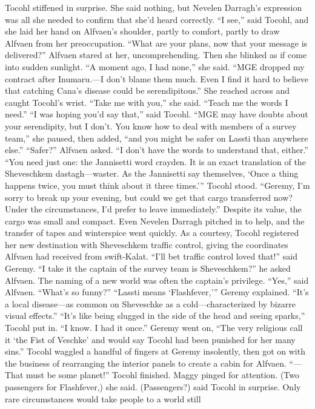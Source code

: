 \documentclass[9pt]{article}
\begin{document}
Tocohl stiffened in surprise. She said nothing, but Nevelen Darragh’s expression was all she needed
to confirm that she’d heard correctly.
“I see,” said Tocohl, and she laid her hand on Alfvaen’s shoulder, partly to comfort, partly to draw
Alfvaen from her preoccupation. “What are your plans, now that your message is delivered?”
Alfvaen stared at her, uncomprehending. Then she blinked as if come into sudden sunlight.
“A moment ago, I had none,” she said. “MGE dropped my contract after Inumaru.—I don’t blame
them much. Even I find it hard to believe that catching Cana’s disease could be serendipitous.”
She reached across and caught Tocohl’s wrist. “Take me with you,” she said. “Teach me the words I
need.”
“I was hoping you’d say that,” said Tocohl. “MGE may have doubts about your serendipity, but I
don’t. You know how to deal with members of a survey team,” she paused, then added, “and you might
be safer on Lassti than anywhere else.”
“Safer?” Alfvaen asked. “I don’t have the words to understand that, either.”
“You need just one: the Jannisetti word crayden. It is an exact translation of the Sheveschkem
dastagh—waster. As the Jannisetti say themselves, ‘Once a thing happens twice, you must think about it
three times.’” Tocohl stood. “Geremy, I’m sorry to break up your evening, but could we get that cargo
transferred now? Under the circumstances, I’d prefer to leave immediately.”
Despite its value, the cargo was small and compact. Even Nevelen Darragh pitched in to help, and
the transfer of tapes and winterspice went quickly. As a courtesy, Tocohl registered her new destination
with Sheveschkem traffic control, giving the coordinates Alfvaen had received from swift-Kalat.
“I’ll bet traffic control loved that!” said Geremy. “I take it the captain of the survey team is
Sheveschkem?” he asked Alfvaen. The naming of a new world was often the captain’s privilege.
“Yes,” said Alfvaen. “What’s so funny?”
“Lassti means ‘Flashfever,’” Geremy explained. “It’s a local disease—as common on Sheveschke as
a cold—characterized by bizarre visual effects.”
“It’s like being slugged in the side of the head and seeing sparks,” Tocohl put in. “I know. I had it
once.”
Geremy went on, “The very religious call it ‘the Fist of Veschke’ and would say Tocohl had been
punished for her many sins.”
Tocohl waggled a handful of fingers at Geremy insolently, then got on with the business of rearranging
the interior panels to create a cabin for Alfvaen.
“—That must be some planet!” Tocohl finished.
Maggy pinged for attention. (Two passengers for Flashfever,) she said.
(Passengers?) said Tocohl in surprise. Only rare circumstances would take people to a world still
\end{document}

